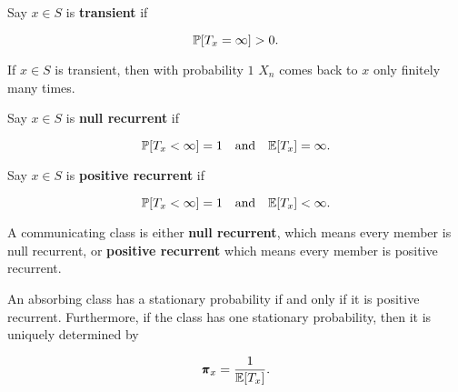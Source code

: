 \begin{definition}[Transience]
    Say $x \in S$ is \textbf{transient} if 
    
    \begin{equation*}
        \mathbb{P}[T_x = \infty] > 0.
    \end{equation*}
\end{definition}

\begin{remark}
    If $x \in S$ is transient, then with probability $1$ $X_n$ comes back to $x$ only finitely many times.
\end{remark}

\begin{definition}
    Say $x \in S$ is \textbf{null recurrent} if 

    \begin{equation*}
        \mathbb{P}[T_x < \infty] = 1 \quad \text{and} \quad \mathbb{E}[T_x] = \infty.
    \end{equation*}
\end{definition}

\begin{definition}
    Say $x \in S$ is \textbf{positive recurrent} if 

    \begin{equation*}
        \mathbb{P}[T_x < \infty] = 1 \quad \text{and} \quad \mathbb{E}[T_x] < \infty.
    \end{equation*}
\end{definition}

\begin{remark}
    A communicating class is either \textbf{null recurrent}, which means every member is null recurrent, or \textbf{positive recurrent} which means every member is positive recurrent. 
\end{remark}

\begin{theorem}
    An absorbing class has a stationary probability if and only if it is positive recurrent. Furthermore, if the class has one stationary probability, then it is uniquely determined by 
    
    \begin{equation*}
        \pmb{\pi}_x = \frac{1}{\mathbb{E}[T_x]}.
    \end{equation*}
\end{theorem}